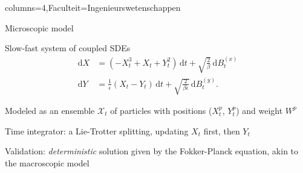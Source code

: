 \documentclass[landscape,a0paper,fontscale=0.45]{kuleuvenposter}
\newcommand{\dd}{\,\mathrm{d}}
\begin{document}
\begin{poster}{columns=4,Faculteit=Ingenieurswetenschappen}
\begin{posterbox}[name=microscopic, column=0,below=micro-macro modelling]{Microscopic model}
\begin{noindentitemize}
\item Slow-fast system of coupled SDEs
\begin{align}
\dd X &= (-X_t^3 + X_t + Y_t^2) \dd t + \sqrt{\frac{2}{\beta}} \dd B_t^{(x)}  \label{eq:xParisdyn}\\
\dd Y &= \frac{1}{\epsilon}(X_t - Y_t) \dd t + \sqrt{\frac{2}{\beta\epsilon}} \dd B_t^{(y)}. \label{eq:yParisdyn}
\end{align}
%
\item Modeled as an ensemble $\mathcal{X}_t$ of particles with positions ($X_t^p$, $Y_t^p$) and weight $W^p$
\item Time integrator: a Lie-Trotter splitting, updating $X_t$ first, then $Y_t$
\item Validation: \emph{deterministic} solution given by the Fokker-Planck equation, akin to the macroscopic model
\end{noindentitemize}
\end{posterbox}


\end{poster}
\end{document}

